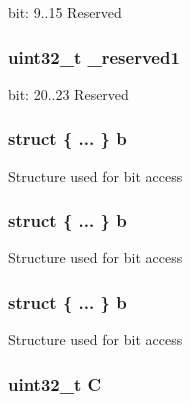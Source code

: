 bit\-: 9..15 Reserved \hypertarget{unionx_p_s_r___type_a959a73d8faee56599b7e792a7c5a2d16}{
\subsubsection[{\-\_\-reserved1}]{\setlength{\rightskip}{0pt plus 5cm}uint32\-\_\-t \-\_\-reserved1}}\label{unionx_p_s_r___type_a959a73d8faee56599b7e792a7c5a2d16}
bit\-: 20..23 Reserved \hypertarget{unionx_p_s_r___type_a8d8c45d946ef8df11f4cac72c667e98b}{
\subsubsection[{b}]{\setlength{\rightskip}{0pt plus 5cm}struct \{ ... \}   b}}\label{unionx_p_s_r___type_a8d8c45d946ef8df11f4cac72c667e98b}
Structure used for bit access \hypertarget{unionx_p_s_r___type_a5fe7b3d4251f5516a5cc744f416a600a}{
\subsubsection[{b}]{\setlength{\rightskip}{0pt plus 5cm}struct \{ ... \}   b}}\label{unionx_p_s_r___type_a5fe7b3d4251f5516a5cc744f416a600a}
Structure used for bit access \hypertarget{unionx_p_s_r___type_a1b59d9c685f4e15edd10b7dc1eeae4c1}{
\subsubsection[{b}]{\setlength{\rightskip}{0pt plus 5cm}struct \{ ... \}   b}}\label{unionx_p_s_r___type_a1b59d9c685f4e15edd10b7dc1eeae4c1}
Structure used for bit access \hypertarget{unionx_p_s_r___type_a7a1caf92f32fe9ebd8d1fe89b06c7776}{
\subsubsection[{C}]{\setlength{\rightskip}{0pt plus 5cm}uint32\-\_\-t C}}\label{unionx_p_s_r___type_a7a1caf92f32fe9ebd8d1fe89b06c7776}

